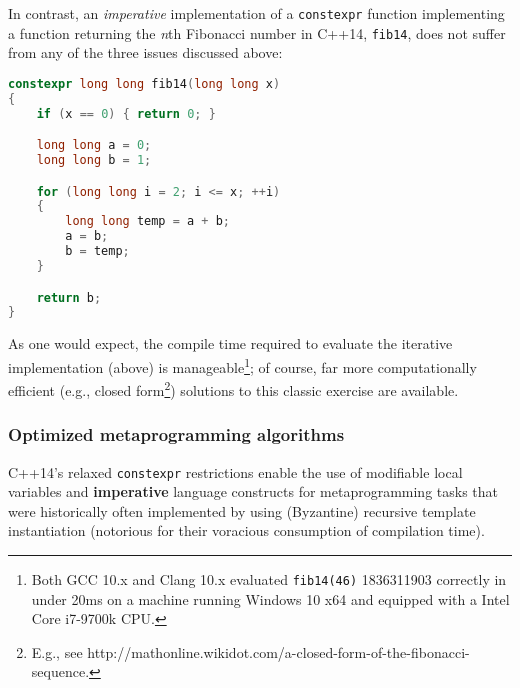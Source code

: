 In contrast, an \emph{imperative} implementation of a \texttt{constexpr}
function implementing a function returning the \emph{n\/}th Fibonacci
number in C++14, \texttt{fib14}, does not suffer from any of the three
issues discussed above:

\begin{lstlisting}[language=C++]
constexpr long long fib14(long long x)
{
    if (x == 0) { return 0; }

    long long a = 0;
    long long b = 1;

    for (long long i = 2; i <= x; ++i)
    {
        long long temp = a + b;
        a = b;
        b = temp;
    }

    return b;
}
\end{lstlisting}
    
\noindent As one would expect, the compile time required to evaluate the iterative
implementation (above) is manageable{\cprotect\footnote{Both GCC 10.x
and Clang 10.x evaluated \texttt{fib14(46)} 1836311903 correctly in
under 20ms on a machine running Windows 10 x64 and equipped with a
  Intel Core i7-9700k CPU.}}; of course, far more
computationally efficient (e.g., closed form{\cprotect\footnote{E.g.,
see
  http://mathonline.wikidot.com/a-closed-form-of-the-fibonacci-sequence.}})
solutions to this classic exercise are available.

\subsubsection[Optimized metaprogramming algorithms]{Optimized metaprogramming algorithms}\label{optimized-metaprogramming-algorithms}

C++14's relaxed \texttt{constexpr} restrictions enable the use of
modifiable local variables and \textbf{imperative} language constructs
for metaprogramming tasks that were historically often implemented by
using (Byzantine) recursive template instantiation (notorious for their
voracious consumption of compilation time).

